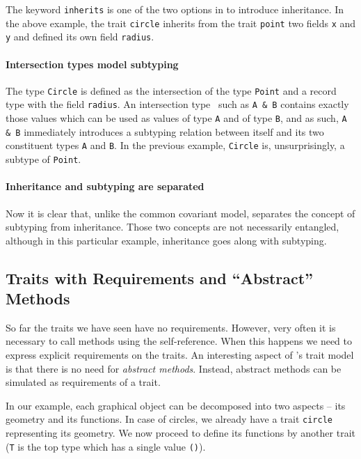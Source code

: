 The keyword \lstinline{inherits} is one of the two options in \name to introduce
inheritance. In the above example, the trait \lstinline{circle} inherits from
the trait \lstinline{point} two fields \lstinline{x} and \lstinline{y}
and defined its own field \lstinline{radius}.

\paragraph{Intersection types model subtyping}
The type \lstinline{Circle} is defined as the intersection of the type
\lstinline{Point} and a record type with the field \lstinline{radius}. An
intersection type~\cite{coppo1981functional,pottinger1980type} such as
\lstinline{A & B} contains exactly those values which can be used as values of
type \lstinline{A} and of type \lstinline{B}, and as such, \lstinline{A & B}
immediately introduces a subtyping relation between itself and its two
constituent types \lstinline{A} and \lstinline{B}. In the previous example,
\lstinline{Circle} is, unsurprisingly, a subtype of \lstinline{Point}.

\paragraph{Inheritance and subtyping are separated}
Now it is clear that, unlike the common covariant
model, \name separates the concept of subtyping from inheritance. Those two
concepts are not necessarily entangled, although in this particular example,
inheritance goes along with subtyping.

\subsection{Traits with Requirements and ``Abstract'' Methods}

So far the traits we have seen have no requirements. However, very often it is
necessary to call methods using the self-reference. When this happens
we need to express explicit requirements on the traits. An interesting aspect
of \name's trait model is that there is no need for \emph{abstract
  methods}. Instead, abstract methods can be simulated as requirements 
of a trait. 

In our example, each graphical object can be decomposed into two aspects -- its
geometry and its functions. In case of circles, we already have a trait
\lstinline{circle} representing its geometry. We now proceed to define its
functions by another trait (\lstinline{T} is the top type which has a single
value \lstinline{()}).

